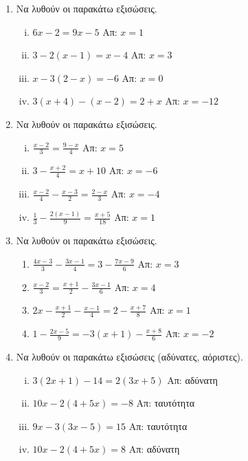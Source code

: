 \begin{enumerate}
  \item  Να λυθούν οι παρακάτω εξισώσεις.
    \begin{enumerate}[i)]
      \item $ 6x-2=9x-5 $ \hfill Απ: $ x=1 $
      \item $ 3-2(x-1)=x-4 $ \hfill Απ: $ x=3 $ 
      \item $ x-3(2-x)=-6 $ \hfill Απ: $ x=0 $ 
      \item $ 3(x+4)-(x-2) = 2+x $ \hfill Απ: $ x=-12 $ 
    \end{enumerate}

  \item  Να λυθούν οι παρακάτω εξισώσεις.
    \begin{enumerate}[i)]
      \item $ \frac{x-2}{3} = \frac{9-x}{4} $ \hfill Απ: $ x=5 $ 
      \item $ 3 - \frac{x+2}{4} = x+10 $ \hfill Απ: $ x=-6 $ 
      \item $ \frac{x-2}{4} - \frac{x-3}{2} = \frac{2-x}{3} $ \hfill Απ: $ x=-4 $ 
      \item $ \frac{1}{3} - \frac{2(x-1)}{9} = \frac{x+5}{18} $ \hfill Απ: $ x=1 $ 
    \end{enumerate}

  \item  Να λυθούν οι παρακάτω εξισώσεις.
    \begin{enumerate}
      \item $ \frac{4x-3}{3} - \frac{3x-1}{4} = 3 - \frac{7x-9}{6} $ 
        \hfill Απ: $ x=3 $ 
      \item $ \frac{x-2}{3} = \frac{x+1}{2} - \frac{3x-1}{6} $ \hfill Απ: $ x=4 $ 
      \item $ 2x- \frac{x+1}{2} - \frac{x-1}{4} = 2 - \frac{x+7}{8} $ 
        \hfill Απ: $ x=1 $
      \item $ 1 - \frac{2x-5}{9} = -3(x+1) - \frac{x+8}{6} $ \hfill Απ: $ x=-2 $  
    \end{enumerate}

  \item  Να λυθούν οι παρακάτω εξισώσεις (αδύνατες, αόριστες).
    \begin{enumerate}[i)]
      \item $ 3(2x+1) - 14 = 2(3x+5) $ \hfill Απ: αδύνατη 
      \item $ 10x-2(4+5x) =-8 $ \hfill Απ: ταυτότητα 
      \item $ 9x-3(3x-5)=15 $ \hfill Απ: ταυτότητα 
      \item $ 10x-2(4+5x) = 8 $ \hfill Απ: αδύνατη 
    \end{enumerate}


\end{enumerate}
